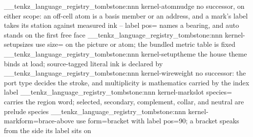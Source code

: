 %
\__tenkz_language_registry_tombstone:nnn {kernel-atom}{nudge}
  {no successor, on either scope: an off-cell atom is a basis member or
    an address, and a mark's label takes its station against measured
    ink -- label pos= names a bearing, and auto stands on the first
    free face}
%
\__tenkz_language_registry_tombstone:nnn {kernel-setup}{sizes}
  {use size= on the picture or atom; the bundled metric table is fixed}
%
\__tenkz_language_registry_tombstone:nnn {kernel-setup}{theme}
  {the house theme binds at load; source-tagged literal ink is declared by
    }
%
\__tenkz_language_registry_tombstone:nnn {kernel-wire}{weight}
  {no successor: the port type decides the stroke, and multiplicity is
    mathematics carried by the index label}
%
\__tenkz_language_registry_tombstone:nnn {kernel-mark}{slot}
  {species= carries the region word; selected, secondary, complement,
    collar, and neutral are prelude species}
%
\__tenkz_language_registry_tombstone:nnn {kernel-mark}{form=brace-above}
  {use form=bracket with label pos=90; a bracket speaks from the side its
    label sits on}
